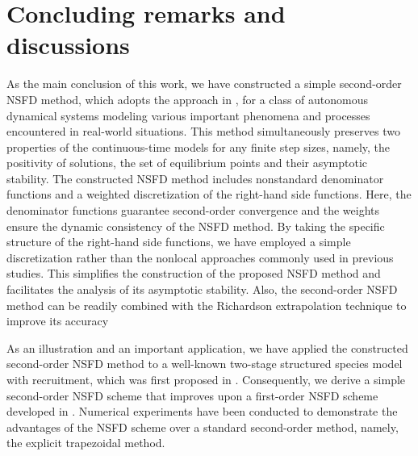 \documentclass[12pt]{article}
\theoremstyle{definition}
\theoremstyle{remark}
\numberwithin{equation}{section}
\begin{document}
\section{Concluding remarks and discussions}
As the main conclusion of this work, we have constructed a simple second-order NSFD method, which adopts the approach in \cite{Hoang2023}, for a class of autonomous dynamical systems modeling various important phenomena and processes encountered in real-world situations. This method simultaneously preserves two properties of the continuous-time models for any finite step sizes, namely, the positivity of solutions, the set of equilibrium points and their asymptotic stability. The constructed NSFD method includes nonstandard denominator functions and a weighted discretization of the right-hand side functions. Here, the denominator functions guarantee second-order convergence and the weights ensure the dynamic consistency of the NSFD method. By taking the specific structure of the right-hand side functions, we have employed a simple discretization rather than the nonlocal approaches commonly used in previous studies. This simplifies the construction of the proposed NSFD method and facilitates the analysis of its asymptotic stability. Also, the second-order NSFD method can be readily combined with the Richardson extrapolation technique to improve its accuracy

As an illustration and an important application, we have applied the constructed second-order NSFD method to a well-known two-stage structured species model with recruitment, which was first proposed in \cite{Ladino}. Consequently, we derive a simple second-order NSFD scheme that improves upon a first-order NSFD scheme developed in \cite{HoangValverde}. Numerical experiments have been conducted to demonstrate the advantages of the NSFD scheme over a standard second-order method, namely, the explicit trapezoidal method.
\end{document}
